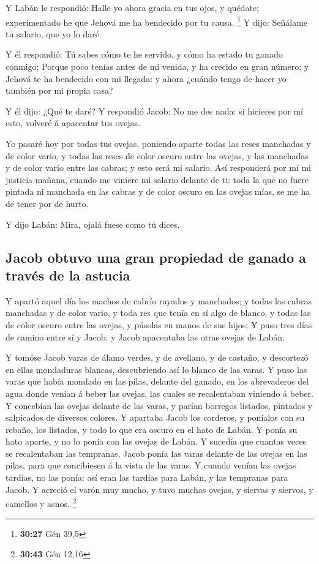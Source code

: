  Y Labán le respondió: Halle yo ahora gracia en tus ojos, y
quédate; experimentado he que Jehová me ha bendecido por tu causa.
\footnote{\textbf{30:27} Gén 39,5}  Y dijo: Señálame tu
salario, que yo lo daré.

 Y él respondió: Tú sabes cómo te he servido, y cómo ha
estado tu ganado conmigo;  Porque poco tenías antes de mi
venida, y ha crecido en gran número; y Jehová te ha bendecido con mi
llegada: y ahora ¿cuándo tengo de hacer yo también por mi propia casa?

 Y él dijo: ¿Qué te daré? Y respondió Jacob: No me des
nada: si hicieres por mí esto, volveré á apacentar tus ovejas.

 Yo pasaré hoy por todas tus ovejas, poniendo aparte todas
las reses manchadas y de color vario, y todas las reses de color oscuro
entre las ovejas, y las manchadas y de color vario entre las cabras; y
esto será mi salario.  Así responderá por mí mi justicia
mañana, cuando me viniere mi salario delante de ti: toda la que no fuere
pintada ni manchada en las cabras y de color oscuro en las ovejas mías,
se me ha de tener por de hurto.

 Y dijo Labán: Mira, ojalá fuese como tú dices.

\hypertarget{jacob-obtuvo-una-gran-propiedad-de-ganado-a-travuxe9s-de-la-astucia}{%
\subsection{Jacob obtuvo una gran propiedad de ganado a través de la
astucia}\label{jacob-obtuvo-una-gran-propiedad-de-ganado-a-travuxe9s-de-la-astucia}}

 Y apartó aquel día los machos de cabrío rayados y
manchados; y todas las cabras manchadas y de color vario, y toda res que
tenía en sí algo de blanco, y todas las de color oscuro entre las
ovejas, y púsolas en manos de sus hijos;  Y puso tres días
de camino entre sí y Jacob: y Jacob apacentaba las otras ovejas de
Labán.

 Y tomóse Jacob varas de álamo verdes, y de avellano, y de
castaño, y descortezó en ellas mondaduras blancas, descubriendo así lo
blanco de las varas.  Y puso las varas que había mondado en
las pilas, delante del ganado, en los abrevaderos del agua donde venían
á beber las ovejas, las cuales se recalentaban viniendo á beber.
 Y concebían las ovejas delante de las varas, y parían
borregos listados, pintados y salpicados de diversos colores.
 Y apartaba Jacob los corderos, y poníalos con su rebaño,
los listados, y todo lo que era oscuro en el hato de Labán. Y ponía su
hato aparte, y no lo ponía con las ovejas de Labán.  Y
sucedía que cuantas veces se recalentaban las tempranas, Jacob ponía las
varas delante de las ovejas en las pilas, para que concibiesen á la
vista de las varas.  Y cuando venían las ovejas tardías, no
las ponía: así eran las tardías para Labán, y las tempranas para Jacob.
 Y acreció el varón muy mucho, y tuvo muchas ovejas, y
siervas y siervos, y camellos y asnos. \footnote{\textbf{30:43} Gén
  12,16}

